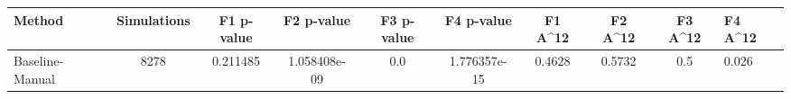 \begin{tabular}{lcccccccc}
\toprule
         Method &  Simulations &  F1 p-value &   F2 p-value &  F3 p-value &   F4 p-value &  F1 A^12 &  F2 A^12 &  F3 A^12 &  F4 A^12 \\
\midrule
Baseline-Manual &         8278 &    0.211485 & 1.058408e-09 &         0.0 & 1.776357e-15 &   0.4628 &   0.5732 &      0.5 &    0.026 \\
\bottomrule
\end{tabular}
